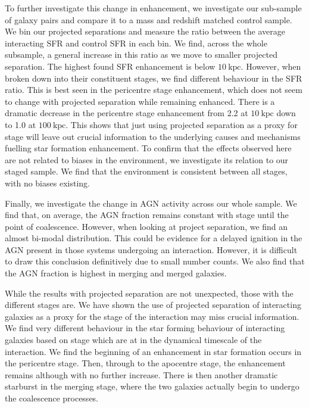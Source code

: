 To further investigate this change in enhancement, we investigate our sub-sample of galaxy pairs and compare it to a mass and redshift matched control sample. We bin our projected separations and measure the ratio between the average interacting SFR and control SFR in each bin. We find, across the whole subsample, a general increase in this ratio as we move to smaller projected separation. The highest found SFR enhancement is below $10~\mathrm{kpc}$. However, when broken down into their constituent stages, we find different behaviour in the SFR ratio. This is best seen in the pericentre stage enhancement, which does not seem to change with projected separation while remaining enhanced. There is a dramatic decrease in the pericentre stage enhancement from 2.2 at $10~\mathrm{kpc}$ down to 1.0 at $100~\mathrm{kpc}$. This shows that just using projected separation as a proxy for stage will leave out crucial information to the underlying causes and mechanisms fuelling star formation enhancement. To confirm that the effects observed here are not related to biases in the environment, we investigate its relation to our staged sample. We find that the environment is consistent between all stages, with no biases existing.

Finally, we investigate the change in AGN activity across our whole sample. We find that, on average, the AGN fraction remains constant with stage until the point of coalescence. However, when looking at project separation, we find an almost bi-modal distribution. This could be evidence for a delayed ignition in the AGN present in those systems undergoing an interaction. However, it is difficult to draw this conclusion definitively due to small number counts. We also find that the AGN fraction is highest in merging and merged galaxies.

While the results with projected separation are not unexpected, those with the different stages are. We have shown the use of projected separation of interacting galaxies as a proxy for the stage of the interaction may miss crucial information. We find very different behaviour in the star forming behaviour of interacting galaxies based on stage which are at in the dynamical timescale of the interaction. We find the beginning of an enhancement in star formation occurs in the pericentre stage. Then, through to the apocentre stage, the enhancement remains although with no further increase. There is then another dramatic starburst in the merging stage, where the two galaxies actually begin to undergo the coalescence processes.

